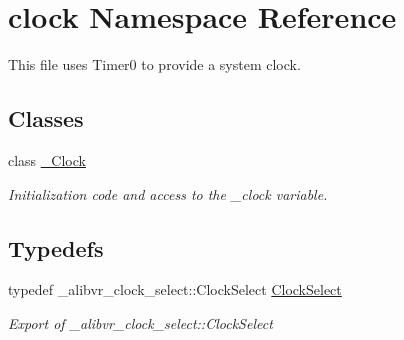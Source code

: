 \hypertarget{namespaceclock}{}\section{clock Namespace Reference}
\label{namespaceclock}


This file uses {\ttfamily Timer0} to provide a system clock.  


\subsection*{Classes}
\begin{DoxyCompactItemize}
\item 
class \hyperlink{classclock_1_1__Clock}{\+\_\+\+Clock}
\begin{DoxyCompactList}\small\item\em Initialization code and access to the \+\_\+clock variable. \end{DoxyCompactList}\end{DoxyCompactItemize}
\subsection*{Typedefs}
\begin{DoxyCompactItemize}
\item 
\hypertarget{namespaceclock_ac435d838e47eaebdb967aebfeab78eae}{}\label{namespaceclock_ac435d838e47eaebdb967aebfeab78eae} 
typedef \+\_\+alibvr\+\_\+clock\+\_\+select\+::\+Clock\+Select \hyperlink{namespaceclock_ac435d838e47eaebdb967aebfeab78eae}{Clock\+Select}
\begin{DoxyCompactList}\small\item\em Export of {\ttfamily \+\_\+alibvr\+\_\+clock\+\_\+select\+::\+Clock\+Select} \end{DoxyCompactList}\end{DoxyCompactItemize}
